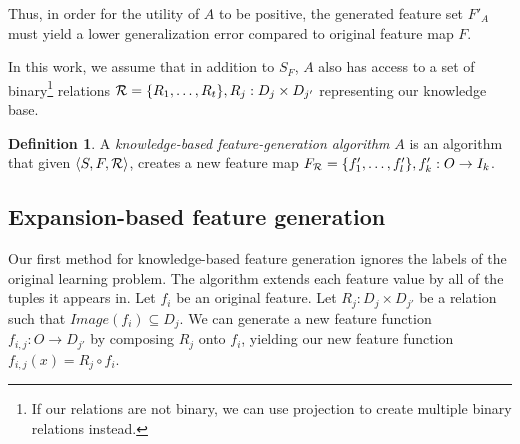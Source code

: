 \documentclass{article}
\theoremstyle{definition}
\newtheorem{defn}{Definition}[section]
\begin{document}
Thus, in order for the utility of $A$ to be positive, the generated feature set $F'_A$ must yield a lower generalization error compared to original feature map $F$.

In this work, we assume that in addition to $S_F$, $A$ also has access to a set of binary\footnote{If our relations are not binary, we can use projection to create multiple binary relations instead.} relations ${\cal R}=\{R_{1},\ldots,R_{t}\}, R_j:D_j\times D_{j'}$ representing our knowledge base. 
\begin{defn}
	A \emph{knowledge-based feature-generation algorithm} $A$ is an algorithm that given $\langle S,F,{\cal R} \rangle$, creates a new feature map $F_{{\cal R}}=\{f'_{1},\ldots,f'_{l}\}, f'_{k}:O\rightarrow I_k$.
\end{defn}


\subsection{Expansion-based feature generation} \label{shallow_section}

Our first method for knowledge-based feature generation ignores the labels of the original learning problem.
The algorithm extends each feature value by all of the tuples it appears in.
Let $f_i$ be an original feature. Let $R_j:D_j\times D_{j'}$ be a relation such that  $Image(f_i) \subseteq D_j$. We can generate a new feature function $f_{i,j}:O\rightarrow D_{j'}$ by composing $R_j$ onto $f_i$, yielding our new feature function  $f_{i,j}(x)=R_j\circ f_i$.

\end{document}

